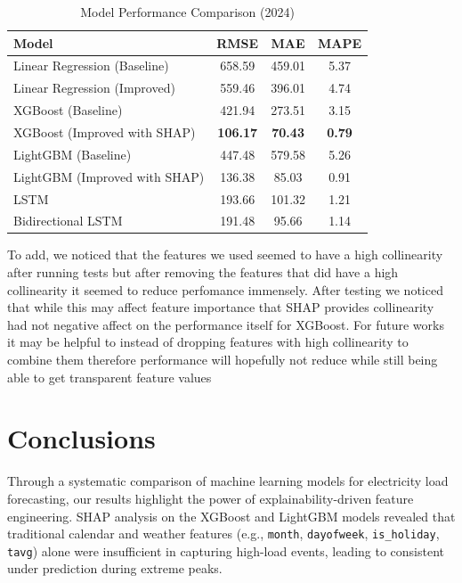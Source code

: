 \documentclass{ifacconf}
\begin{document}
\begin{table}[h!]
\centering
\caption{Model Performance Comparison (2024)}
\label{tab:model_performance}
\begin{tabular}{lccc}
\toprule
\textbf{Model} & \textbf{RMSE} & \textbf{MAE} & \textbf{MAPE } \\
\midrule
Linear Regression (Baseline)       & 658.59 & 459.01 & 5.37 \\
Linear Regression (Improved)       & 559.46 & 396.01 & 4.74 \\
XGBoost (Baseline)                 & 421.94 & 273.51 & 3.15 \\
XGBoost (Improved with SHAP)       & \textbf{106.17} & \textbf{70.43} & \textbf{0.79} \\
LightGBM (Baseline)                & 447.48 & 579.58 & 5.26 \\
LightGBM (Improved with SHAP)      & 136.38 & 85.03  & 0.91 \\
LSTM                               & 193.66 & 101.32 & 1.21 \\
Bidirectional LSTM                 & 191.48 & 95.66  & 1.14 \\
\bottomrule
\end{tabular}
\end{table}



To add, we noticed that the features we used seemed to have a high collinearity after running tests but after removing the features that did have a high collinearity it seemed to reduce perfomance immensely. After testing we noticed that while this may affect feature importance that SHAP provides collinearity had not negative affect on the performance itself for XGBoost. For future works it may be helpful to instead of dropping features with high collinearity to combine them therefore performance will hopefully not reduce while still being able to get transparent feature values
\section{Conclusions}
Through a systematic comparison of machine learning models for electricity load forecasting, our results highlight the power of explainability-driven feature engineering. SHAP analysis on the XGBoost and LightGBM models revealed that traditional calendar and weather features (e.g., \texttt{month}, \texttt{dayofweek}, \texttt{is_holiday}, \texttt{tavg}) alone were insufficient in capturing high-load events, leading to consistent under prediction during extreme peaks.
\end{document}
